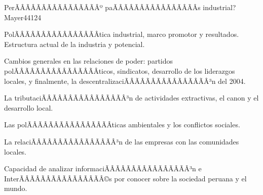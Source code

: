 \begin{syllabus}
\begin{unit}{PerÃÂÃÂÃÂÃÂÃÂÃÂÃÂÃÂº paÃÂÃÂÃÂÃÂÃÂÃÂÃÂÃÂ­s industrial?}{}{Mayer44}{12}{4}
\begin{topics}
      \item PolÃÂÃÂÃÂÃÂÃÂÃÂÃÂÃÂ­tica industrial, marco promotor y resultados. Estructura actual de la industria y potencial.
      \item Cambios generales en las relaciones de poder: partidos polÃÂÃÂÃÂÃÂÃÂÃÂÃÂÃÂ­ticos, sindicatos, desarrollo de los liderazgos locales, y finalmente, la descentralizaciÃÂÃÂÃÂÃÂÃÂÃÂÃÂÃÂ³n del 2004.
      \item La tributaciÃÂÃÂÃÂÃÂÃÂÃÂÃÂÃÂ³n de actividades extractivas, el canon y el desarrollo local.
      \item Las polÃÂÃÂÃÂÃÂÃÂÃÂÃÂÃÂ­ticas ambientales y los conflictos sociales.
      \item La relaciÃÂÃÂÃÂÃÂÃÂÃÂÃÂÃÂ³n de las empresas con las comunidades locales.
   \end{topics}
   \begin{learningoutcomes}
      \item Capacidad de analizar informaciÃÂÃÂÃÂÃÂÃÂÃÂÃÂÃÂ³n e InterÃÂÃÂÃÂÃÂÃÂÃÂÃÂÃÂ©s por conocer sobre la sociedad peruana y el mundo.
   \end{learningoutcomes}
\end{unit}



\begin{coursebibliography}
\end{coursebibliography}

\end{syllabus}
